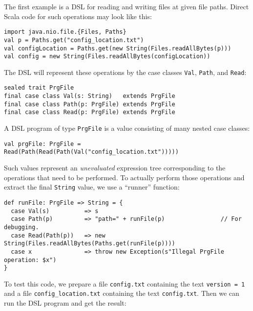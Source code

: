 The first example is a DSL for reading and writing files at given
file paths. Direct Scala code for such operations may look like this:
\begin{lstlisting}
import java.nio.file.{Files, Paths}
val p = Paths.get("config_location.txt")
val configLocation = Paths.get(new String(Files.readAllBytes(p)))
val config = new String(Files.readAllBytes(configLocation))
\end{lstlisting}
The DSL will represent these operations by the case classes \lstinline!Val!,
\lstinline!Path!, and \lstinline!Read!:
\begin{lstlisting}
sealed trait PrgFile
final case class Val(s: String)   extends PrgFile
final case class Path(p: PrgFile) extends PrgFile
final case class Read(p: PrgFile) extends PrgFile
\end{lstlisting}
A DSL program of type \lstinline!PrgFile!
is a value consisting of many nested case classes:
\begin{lstlisting}
val prgFile: PrgFile = Read(Path(Read(Path(Val("config_location.txt")))))
\end{lstlisting}
Such values represent an \emph{unevaluated} expression tree corresponding
to the operations that need to be performed. To actually perform those
operations and extract the final \lstinline!String!
value, we use a \textsf{``}runner\textsf{''} function:
\begin{lstlisting}
def runFile: PrgFile => String = {
  case Val(s)          => s
  case Path(p)         => "path=" + runFile(p)                // For debugging.
  case Read(Path(p))   => new String(Files.readAllBytes(Paths.get(runFile(p))))
  case x               => throw new Exception(s"Illegal PrgFile operation: $x")
}
\end{lstlisting}
To test this code, we prepare a file \lstinline!config.txt!
containing the text \lstinline!version = 1!
and a file \lstinline!config_location.txt!
containing the text \lstinline!config.txt!.
Then we can run the DSL program and get the result:

